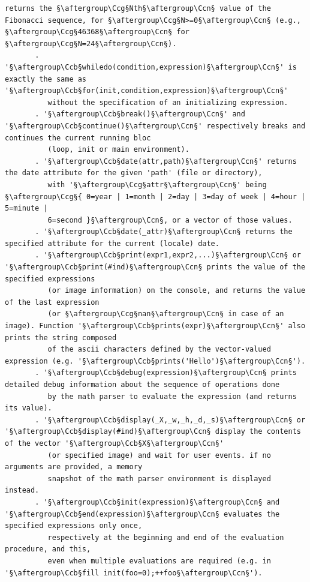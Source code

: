 \documentclass[a4paper,10.5pt,twoside]{book}
\def\Ccb{\color{cb}}
\def\Ccg{\color{cc}}
\def\Ccn{\color{black}}
\begin{document}
\begin{lstlisting}[escapechar=§]
          returns the §\aftergroup\Ccg§Nth§\aftergroup\Ccn§ value of the Fibonacci sequence, for §\aftergroup\Ccg§N>=0§\aftergroup\Ccn§ (e.g., §\aftergroup\Ccg§46368§\aftergroup\Ccn§ for §\aftergroup\Ccg§N=24§\aftergroup\Ccn§). 
       . '§\aftergroup\Ccb§whiledo(condition,expression)§\aftergroup\Ccn§' is exactly the same as '§\aftergroup\Ccb§for(init,condition,expression)§\aftergroup\Ccn§' 
          without the specification of an initializing expression. 
       . '§\aftergroup\Ccb§break()§\aftergroup\Ccn§' and '§\aftergroup\Ccb§continue()§\aftergroup\Ccn§' respectively breaks and continues the current running bloc 
          (loop, init or main environment). 
       . '§\aftergroup\Ccb§date(attr,path)§\aftergroup\Ccn§' returns the date attribute for the given 'path' (file or directory), 
          with '§\aftergroup\Ccg§attr§\aftergroup\Ccn§' being §\aftergroup\Ccg§{ 0=year | 1=month | 2=day | 3=day of week | 4=hour | 5=minute | 
          6=second }§\aftergroup\Ccn§, or a vector of those values. 
       . '§\aftergroup\Ccb§date(_attr)§\aftergroup\Ccn§ returns the specified attribute for the current (locale) date. 
       . '§\aftergroup\Ccb§print(expr1,expr2,...)§\aftergroup\Ccn§ or '§\aftergroup\Ccb§print(#ind)§\aftergroup\Ccn§ prints the value of the specified expressions 
          (or image information) on the console, and returns the value of the last expression 
          (or §\aftergroup\Ccg§nan§\aftergroup\Ccn§ in case of an image). Function '§\aftergroup\Ccb§prints(expr)§\aftergroup\Ccn§' also prints the string composed 
          of the ascii characters defined by the vector-valued expression (e.g. '§\aftergroup\Ccb§prints('Hello')§\aftergroup\Ccn§'). 
       . '§\aftergroup\Ccb§debug(expression)§\aftergroup\Ccn§ prints detailed debug information about the sequence of operations done 
          by the math parser to evaluate the expression (and returns its value). 
       . '§\aftergroup\Ccb§display(_X,_w,_h,_d,_s)§\aftergroup\Ccn§ or '§\aftergroup\Ccb§display(#ind)§\aftergroup\Ccn§ display the contents of the vector '§\aftergroup\Ccb§X§\aftergroup\Ccn§' 
          (or specified image) and wait for user events. if no arguments are provided, a memory 
          snapshot of the math parser environment is displayed instead. 
       . '§\aftergroup\Ccb§init(expression)§\aftergroup\Ccn§ and '§\aftergroup\Ccb§end(expression)§\aftergroup\Ccn§ evaluates the specified expressions only once, 
          respectively at the beginning and end of the evaluation procedure, and this, 
          even when multiple evaluations are required (e.g. in '§\aftergroup\Ccb§fill init(foo=0);++foo§\aftergroup\Ccn§'). 

\end{lstlisting}
\end{document}
